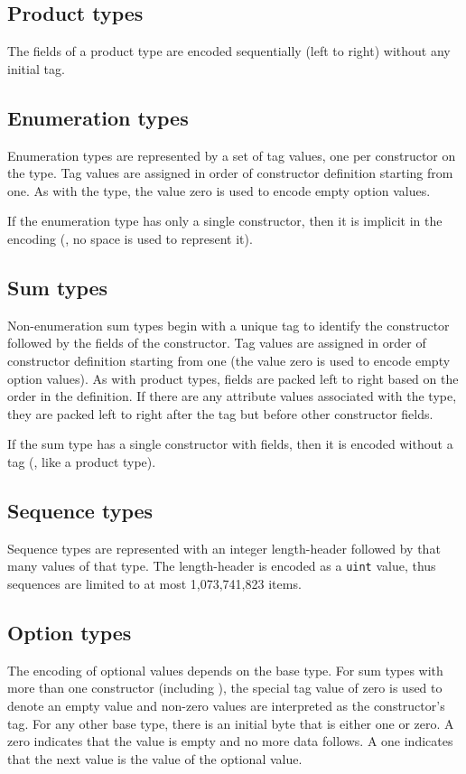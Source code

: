 \subsection{Product types}
The fields of a product type are encoded sequentially (left to right)
without any initial tag.

\subsection{Enumeration types}
Enumeration types are represented by a set of tag values, one per constructor
on the type.
Tag values are assigned in order of constructor definition starting from one.
As with the \lstinline@bool@ type, the value zero is used to encode empty option values.

If the enumeration type has only a single constructor, then it is implicit in
the encoding (\ie{}, no space is used to represent it).

\subsection{Sum types}
Non-enumeration sum types begin with a unique tag to identify the constructor
followed by the fields of the constructor.
Tag values are assigned in order of constructor definition starting from one (the
value zero is used to encode empty option values).
As with product types, fields are packed left to right based on the order
in the definition.
If there are any attribute values associated with the type, they are packed left to right
after the tag but before other constructor fields.
  
If the sum type has a single constructor with fields, then it is
encoded without a tag (\ie{}, like a product type).

\subsection{Sequence types}
Sequence types are represented with an integer length-header followed by
that many values of that type.
The length-header is encoded as a \lstinline!uint! value, thus sequences are limited
to at most 1,073,741,823 items.

\subsection{Option types}
The encoding of optional values depends on the base type.
For sum types with more than one constructor (including \lstinline@bool@),
the special tag value of zero is used to denote an empty value and
non-zero values are interpreted as the constructor's tag.
For any other base type, there is an initial byte that is either one or zero.
A zero indicates that the value is empty and no more data follows.
A one indicates that the next value is the value of the optional value.

